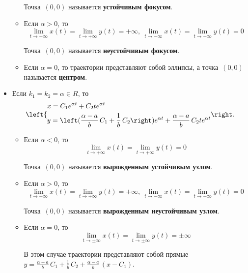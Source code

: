 \begin{itemize}
\begin{itemize}
		Точка~$(0, 0)$ называется \textbf{устойчивым фокусом}.

		\item Если $\alpha > 0$, то
		\begin{equation*}
		\lim_{t \to +\infty} x(t) = \lim_{t \to +\infty} y(t) = +\infty, \
		\lim_{t \to -\infty} x(t) = \lim_{t \to -\infty} y(t) = 0
		\end{equation*}
		
		Точка~$(0, 0)$ называется \textbf{неустойчивым фокусом}.
		
		\item Если $\alpha = 0$, то траектории представляют собой эллипсы, а точка~$(0, 0)$ называется \textbf{центром}.
	\end{itemize}
	
	\item Если $k_1 = k_2 = \alpha \in R$, то
	\begin{equation*}
	\begin{dcases}
	x = C_1 e^{\alpha t} + C_2 t e^{\alpha t} \\
	y = \left(\frac{\alpha - a}b\,C_1 + \frac1b\,C_2\right) e^{\alpha t} +
	\frac{\alpha - a}b\,C_2 t e^{\alpha t}
	\end{dcases}
	\end{equation*}
	
	\begin{itemize}
		\item Если $\alpha < 0$, то
		\begin{equation*}
		\lim_{t \to +\infty} x(t) = \lim_{t \to +\infty} y(t) = 0
		\end{equation*}
		
		Точка~$(0, 0)$ называется \textbf{вырожденным устойчивым узлом}.
		
		\item Если $\alpha > 0$, то
		\begin{equation*}
		\lim_{t \to +\infty} x(t) = \lim_{t \to +\infty} y(t) = +\infty, \
		\lim_{t \to -\infty} x(t) = \lim_{t \to -\infty} y(t) = 0
		\end{equation*}
		
		Точка~$(0, 0)$ называется \textbf{вырожденным неустойчивым узлом}.
		
		\item Если $\alpha = 0$, то
		\begin{equation*}
		\lim_{t \to \pm\infty} x(t) = \lim_{t \to \pm\infty} y(t) = \pm\infty
		\end{equation*}
		
		В этом случае траектории представляют собой прямые~$y = \frac{\alpha - a}b\,C_1 + \frac1b\,C_2 + \frac{\alpha - a}b\,(x - C_1)$.
	\end{itemize}
\end{itemize}

